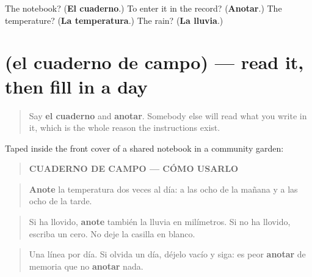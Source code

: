 \begin{tcolorbox}[breakable,colback=teal!4,colframe=teal!35!black,title={Before you move on}]
The notebook? (\textbf{El cuaderno}.) To enter it in the record? (\textbf{Anotar}.) The temperature? (\textbf{La temperatura}.) The rain? (\textbf{La lluvia}.)
\end{tcolorbox}
\section[Practice]{(el cuaderno de campo) — read it, then fill in a day}

\label{lesson:ES-C465-sintesis-apunte}



\begin{quote}
Say \textbf{el cuaderno} and \textbf{anotar}. Somebody else will read what you write in it, which is the whole reason the instructions exist.
\end{quote}

\begin{tcolorbox}[breakable,skin=enhanced,colback=orange!6,colframe=orange!45!black,boxrule=0.5pt,arc=1mm,left=6pt,right=6pt,top=4pt,bottom=4pt,fonttitle=\bfseries,title={Read this}]
Taped inside the front cover of a shared notebook in a community garden:

\begin{quote}
\textbf{CUADERNO DE CAMPO — CÓMO USARLO}
\end{quote}

\begin{quote}
\textbf{Anote} la temperatura dos veces al día: a las ocho de la mañana y a las ocho de la tarde.
\end{quote}

\begin{quote}
Si ha llovido, \textbf{anote} también la lluvia en milímetros. Si no ha llovido, escriba un cero. No deje la casilla en blanco.
\end{quote}

\begin{quote}
Una línea por día. Si olvida un día, déjelo vacío y siga: es peor \textbf{anotar} de memoria que no \textbf{anotar} nada.
\end{quote}
\end{tcolorbox}

